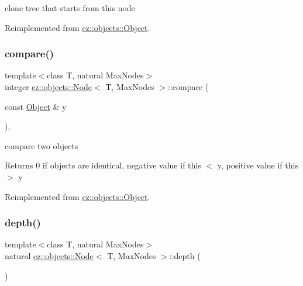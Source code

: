 clone tree that starts from this node 

Reimplemented from \hyperlink{classez_1_1objects_1_1Object_acf444b2581d898eb4b8c92c2d5865c9e}{ez\+::objects\+::\+Object}.

\mbox{\label{classez_1_1objects_1_1Node_af5a55f4379b2f6be1ba3cf905d124462}} 
\subsubsection{\texorpdfstring{compare()}{compare()}}
{\footnotesize\ttfamily template$<$class T, natural Max\+Nodes$>$ \\
integer \hyperlink{classez_1_1objects_1_1Node}{ez\+::objects\+::\+Node}$<$ T, Max\+Nodes $>$\+::compare (\begin{DoxyParamCaption}\item[{const \hyperlink{classez_1_1objects_1_1Object}{Object} \&}]{y }\end{DoxyParamCaption})\hspace{0.3cm}{\ttfamily [inline]}, {\ttfamily [virtual]}}

compare two objects \begin{DoxyReturn}{Returns}
0 if objects are identical, negative value if this $<$ y, positive value if this $>$ y 
\end{DoxyReturn}


Reimplemented from \hyperlink{classez_1_1objects_1_1Object_aca311d389dffa204e425463145f4e1e6}{ez\+::objects\+::\+Object}.

\mbox{\label{classez_1_1objects_1_1Node_a8c9182f152380cec769955b451a76347}} 
\subsubsection{\texorpdfstring{depth()}{depth()}}
{\footnotesize\ttfamily template$<$class T, natural Max\+Nodes$>$ \\
natural \hyperlink{classez_1_1objects_1_1Node}{ez\+::objects\+::\+Node}$<$ T, Max\+Nodes $>$\+::depth (\begin{DoxyParamCaption}{ }\end{DoxyParamCaption})\hspace{0.3cm}{\ttfamily [inline]}}

